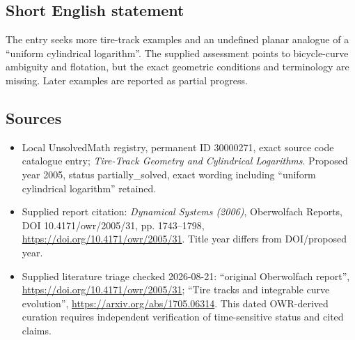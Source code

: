 \documentclass[11pt]{article}
\begin{document}
\subsection{Short English statement}
The entry seeks more tire-track examples and an undefined planar analogue of a ``uniform cylindrical logarithm''. The supplied assessment points to bicycle-curve ambiguity and flotation, but the exact geometric conditions and terminology are missing. Later examples are reported as partial progress.
\subsection{Sources}
\begin{itemize}
\item Local UnsolvedMath registry, permanent ID 30000271, exact source code catalogue entry; \emph{Tire-Track Geometry and Cylindrical Logarithms}. Proposed year 2005, status partially\_solved, exact wording including ``uniform cylindrical logarithm'' retained.
\item Supplied report citation: \emph{Dynamical Systems (2006)}, Oberwolfach Reports, DOI 10.4171/owr/2005/31, pp. 1743--1798, \url{https://doi.org/10.4171/owr/2005/31}. Title year differs from DOI/proposed year.
\item Supplied literature triage checked 2026-08-21: ``original Oberwolfach report'', \url{https://doi.org/10.4171/owr/2005/31}; ``Tire tracks and integrable curve evolution'', \url{https://arxiv.org/abs/1705.06314}. This dated OWR-derived curation requires independent verification of time-sensitive status and cited claims.
\end{itemize}
\end{document}

